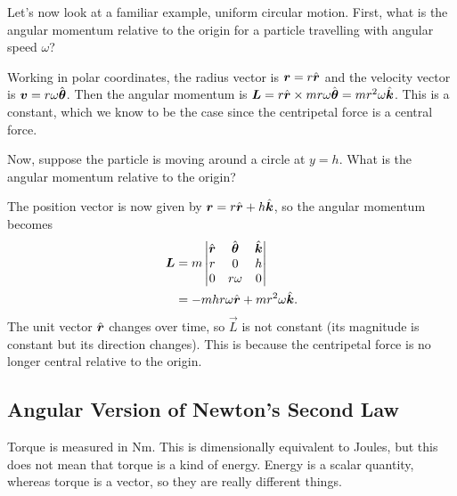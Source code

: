 \documentclass[../classical_mechanics.tex]{subfiles}
\begin{document}
            \begin{example}
                Let's now look at a familiar example, uniform circular motion.
                First, what is the angular momentum relative to the origin for a particle travelling with angular speed $\omega$?

                Working in polar coordinates, the radius vector is $\boldsymbol{r}=r\hat{\boldsymbol{r}}$ and the velocity vector is $\boldsymbol{v}=r\omega\hat{\boldsymbol{\theta}}$.
                Then the angular momentum is $\boldsymbol{L}=r\hat{\boldsymbol{r}}\times mr\omega\hat{\boldsymbol{\theta}}=mr^2\omega\hat{\boldsymbol{k}}$.
                This is a constant, which we know to be the case since the centripetal force is a central force.

                Now, suppose the particle is moving around a circle at $y=h$.
                What is the angular momentum relative to the origin?

                The position vector is now given by $\boldsymbol{r}=r\hat{\boldsymbol{r}}+h\hat{\boldsymbol{k}}$, so the angular momentum becomes
                \begin{align}
                    \boldsymbol{L}&=m\begin{vmatrix}
                        \hat{\boldsymbol{r}} & \hat{\boldsymbol{\theta}} & \hat{\boldsymbol{k}} \\
                        r & 0 & h \\
                        0 & r\omega & 0
                    \end{vmatrix}\\
                    &=-mhr\omega\hat{\boldsymbol{r}}+mr^2\omega\hat{\boldsymbol{k}}.
                \end{align}
                The unit vector $\hat{\boldsymbol{r}}$ changes over time, so $\vec{L}$ is not constant (its magnitude is constant but its direction changes).
                This is because the centripetal force is no longer central relative to the origin.
            \end{example}

        \subsection{Angular Version of Newton's Second Law}\label{subsec:angular-version-of-newtons-second-law}
            Torque is measured in $\unit{\newton\meter}$.
            This is dimensionally equivalent to Joules, but this does not mean that torque is a kind of energy.
            Energy is a scalar quantity, whereas torque is a vector, so they are really different things.
\end{document}
